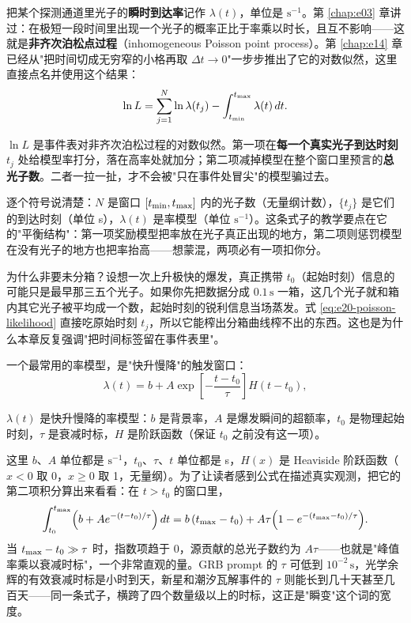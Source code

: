 把某个探测通道里光子的\textbf{瞬时到达率}记作 \(\lambda(t)\)，单位是 \(\mathrm{s^{-1}}\)。第 \ref{chap:e03} 章讲过：在极短一段时间里出现一个光子的概率正比于率乘以时长，且互不影响——这就是\textbf{非齐次泊松点过程}（inhomogeneous Poisson point process）。第 \ref{chap:e14} 章已经从"把时间切成无穷窄的小格再取 \(\Delta t\to0\)"一步步推出了它的对数似然，这里直接点名并使用这个结果：
\begin{equation}
  \ln L=\sum_{j=1}^{N}\ln \lambda(t_j)-\int_{t_{\rm min}}^{t_{\rm max}}\lambda(t)\,dt .
  \label{eq:e20-poisson-likelihood}
\end{equation}
\begin{formulaexplain}
\(\ln L\) 是事件表对非齐次泊松过程的对数似然。第一项在\textbf{每一个真实光子到达时刻} \(t_j\) 处给模型率打分，落在高率处就加分；第二项减掉模型在整个窗口里预言的\textbf{总光子数}。二者一拉一扯，才不会被"只在事件处冒尖"的模型骗过去。
\end{formulaexplain}
逐个符号说清楚：\(N\) 是窗口 \([t_{\rm min},t_{\rm max}]\) 内的光子数（无量纲计数），\(\{t_j\}\) 是它们的到达时刻（单位 s），\(\lambda(t)\) 是率模型（单位 \(\mathrm{s^{-1}}\)）。这条式子的教学要点在它的"平衡结构"：第一项奖励模型把率放在光子真正出现的地方，第二项则惩罚模型在没有光子的地方也把率抬高——想蒙混，两项必有一项扣你分。

为什么非要未分箱？设想一次上升极快的爆发，真正携带 \(t_0\)（起始时刻）信息的可能只是最早那三五个光子。如果你先把数据分成 \(0.1\,\mathrm{s}\) 一箱，这几个光子就和箱内其它光子被平均成一个数，起始时刻的锐利信息当场蒸发。式 \eqref{eq:e20-poisson-likelihood} 直接吃原始时刻 \(t_j\)，所以它能榨出分箱曲线榨不出的东西。这也是为什么本章反复强调"把时间标签留在事件表里"。

一个最常用的率模型，是"快升慢降"的触发窗口：
\begin{equation}
  \lambda(t)=b+A\exp\!\left[-\frac{t-t_0}{\tau}\right]H(t-t_0),
  \label{eq:e20-exponential-rate}
\end{equation}
\begin{formulaexplain}
\(\lambda(t)\) 是快升慢降的率模型：\(b\) 是背景率，\(A\) 是爆发瞬间的超额率，\(t_0\) 是物理起始时刻，\(\tau\) 是衰减时标，\(H\) 是阶跃函数（保证 \(t_0\) 之前没有这一项）。
\end{formulaexplain}
这里 \(b\)、\(A\) 单位都是 \(\mathrm{s^{-1}}\)，\(t_0\)、\(\tau\)、\(t\) 单位都是 s，\(H(x)\) 是 Heaviside 阶跃函数（\(x<0\) 取 0，\(x\ge0\) 取 1，无量纲）。为了让读者感到公式在描述真实观测，把它的第二项积分算出来看看：在 \(t>t_0\) 的窗口里，
\[
  \int_{t_0}^{t_{\rm max}}\!\Big(b+Ae^{-(t-t_0)/\tau}\Big)\,dt
  = b\,(t_{\rm max}-t_0)+A\tau\Big(1-e^{-(t_{\rm max}-t_0)/\tau}\Big).
\]
当 \(t_{\rm max}-t_0\gg\tau\) 时，指数项趋于 0，源贡献的总光子数约为 \(A\tau\)——也就是"峰值率乘以衰减时标"，一个非常直观的量。GRB prompt 的 \(\tau\) 可低到 \(10^{-2}\,\mathrm{s}\)，光学余辉的有效衰减时标是小时到天，新星和潮汐瓦解事件的 \(\tau\) 则能长到几十天甚至几百天——同一条式子，横跨了四个数量级以上的时标，这正是"瞬变"这个词的宽度。

